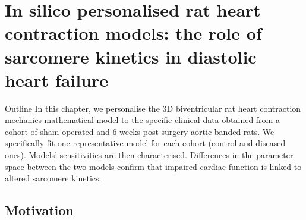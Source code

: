 \chapter{In silico personalised rat heart contraction models: the role of sarcomere kinetics in diastolic heart failure}\label{cha:chapter4}
%
%
%
\begin{remark}{Outline}
    In this chapter, we personalise the $3$D biventricular rat heart contraction mechanics mathematical model to the specific clinical data obtained from a cohort of sham-operated and $6$-weeks-post-surgery aortic banded rats. We specifically fit one representative model for each cohort (control and diseased ones). Models' sensitivities are then characterised. Differences in the parameter space between the two models confirm that impaired cardiac function is linked to altered sarcomere kinetics. 
\end{remark}


%
%
%
\section{Motivation}



